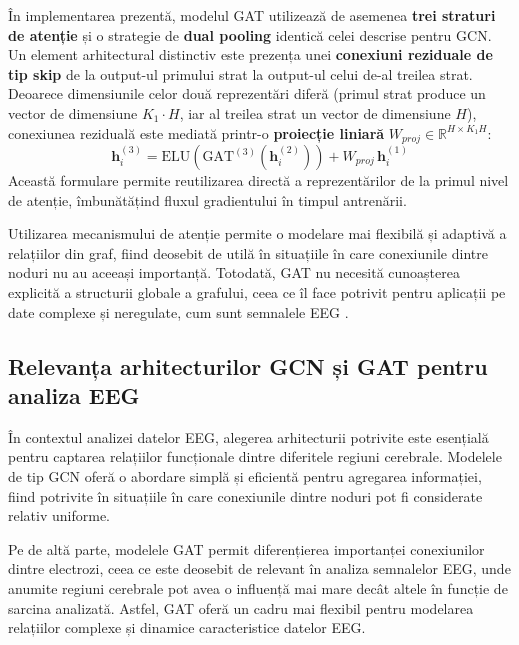 \documentclass[12pt,a4paper]{report}
\theoremstyle{definition}
\theoremstyle{remark}
\begin{document}
În implementarea prezentă, modelul GAT utilizează de asemenea \textbf{trei straturi de atenție} și o strategie de \textbf{dual pooling} identică celei descrise pentru GCN. Un element arhitectural distinctiv este prezența unei \textbf{conexiuni reziduale de tip skip} de la output-ul primului strat la output-ul celui de-al treilea strat. Deoarece dimensiunile celor două reprezentări diferă (primul strat produce un vector de dimensiune $K_1 \cdot H$, iar al treilea strat un vector de dimensiune $H$), conexiunea reziduală este mediată printr-o \textbf{proiecție liniară} $W_{proj} \in \mathbb{R}^{H \times K_1 H}$:
\begin{equation}
    \mathbf{h}_i^{(3)} = \text{ELU}\!\left(\text{GAT}^{(3)}\!\left(\mathbf{h}_i^{(2)}\right)\right) + W_{proj}\,\mathbf{h}_i^{(1)}
    \label{eq:gat_residual_proj}
\end{equation}
Această formulare permite reutilizarea directă a reprezentărilor de la primul nivel de atenție, îmbunătățind fluxul gradientului în timpul antrenării.

Utilizarea mecanismului de atenție permite o modelare mai flexibilă și adaptivă a relațiilor din graf, fiind deosebit de utilă în situațiile în care conexiunile dintre noduri nu au aceeași importanță. Totodată, GAT nu necesită cunoașterea explicită a structurii globale a grafului, ceea ce îl face potrivit pentru aplicații pe date complexe și neregulate, cum sunt semnalele EEG \cite{rahman2025advancement}.

\subsection{Relevanța arhitecturilor GCN și GAT pentru analiza EEG}

În contextul analizei datelor EEG, alegerea arhitecturii potrivite este esențială pentru captarea relațiilor funcționale dintre diferitele regiuni cerebrale. Modelele de tip GCN oferă o abordare simplă și eficientă pentru agregarea informației, fiind potrivite în situațiile în care conexiunile dintre noduri pot fi considerate relativ uniforme.

Pe de altă parte, modelele GAT permit diferențierea importanței conexiunilor dintre electrozi, ceea ce este deosebit de relevant în analiza semnalelor EEG, unde anumite regiuni cerebrale pot avea o influență mai mare decât altele în funcție de sarcina analizată. Astfel, GAT oferă un cadru mai flexibil pentru modelarea relațiilor complexe și dinamice caracteristice datelor EEG.
\end{document}

